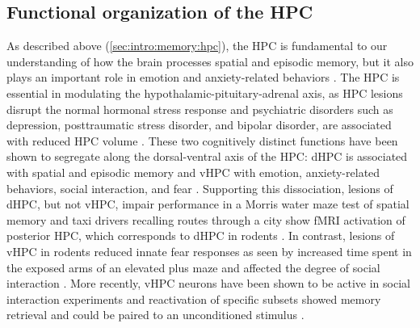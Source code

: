 \subsection{Functional organization of the \acl{HPC}}
As described above (\autoref{sec:intro:memory:hpc}), the \ac{HPC} is fundamental to our understanding of how the brain processes spatial and episodic memory, but it also plays an important role in emotion and anxiety-related behaviors \citep{Fanselow2010}.
The \ac{HPC} is essential in modulating the hypothalamic-pituitary-adrenal axis, as \ac{HPC} lesions disrupt the normal hormonal stress response \citep{Jacobson1991} and psychiatric disorders such as depression, posttraumatic stress disorder, and bipolar disorder, are associated with reduced \ac{HPC} volume \citep{Fanselow2010}.
These two cognitively distinct functions have been shown to segregate along the dorsal-ventral axis of the \ac{HPC}: \ac{dHPC} is associated with spatial and episodic memory and \ac{vHPC} with emotion, anxiety-related behaviors, social interaction, and fear \citep{Moser1998, Fanselow2010, Strange2014}.
Supporting this dissociation, lesions of \ac{dHPC}, but not \ac{vHPC}, impair performance in a Morris water maze test of spatial memory \citep{Moser1995} and taxi drivers recalling routes through a city show \ac{fMRI} activation of posterior \ac{HPC}, which corresponds to \ac{dHPC} in rodents \citep{Maguire1997}.
In contrast, lesions of \ac{vHPC} in rodents reduced innate fear responses as seen by increased time spent in the exposed arms of an elevated plus maze and affected the degree of social interaction \citep{Fanselow2010, Strange2014}.
More recently, \ac{vHPC} neurons have been shown to be active in social interaction experiments and reactivation of specific subsets showed memory retrieval and could be paired to an unconditioned stimulus \citep{Okuyama2016}.

